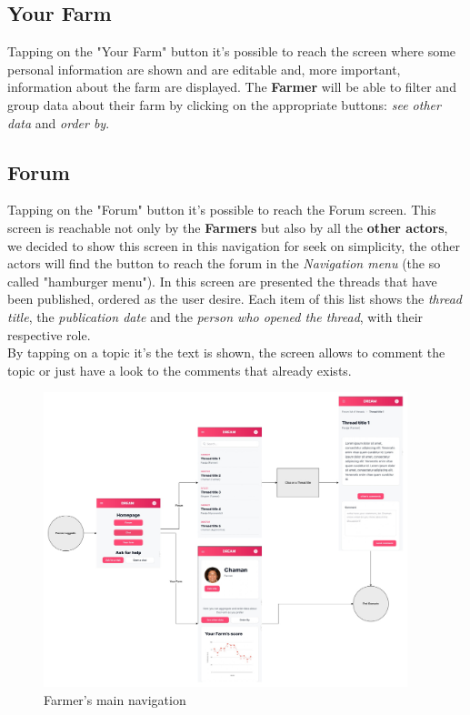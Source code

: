 \documentclass[10pt]{report}
\begin{document}
\subsection{Your Farm}
Tapping on the "Your Farm" button it's possible to reach the screen where some personal information are shown and are editable and, more important, information about the farm are displayed. The \textbf{Farmer} will be able to filter and group data about their farm by clicking on the appropriate buttons: \textit{see other data} and \textit{order by}.
\subsection{Forum}
Tapping on the "Forum" button it's possible to reach the Forum screen. This screen is reachable not only by the \textbf{Farmers} but also by all the \textbf{other actors}, we decided to show this screen in this navigation for seek on simplicity, the other actors will find the button to reach the forum in the \textit{Navigation menu} (the so called "hamburger menu"). 
In this screen are presented the threads that have been published, ordered as the user desire. Each item of this list shows the \textit{thread title}, the \textit{publication date} and the \textit{person who opened the thread}, with their respective role.\\
By tapping on a topic it's the text is shown, the screen allows to comment the topic or just have a look to the comments that already exists. 

\begin{figure}[H]
    \centering
    \includegraphics[width=400px]{Mockups/MockUpDiagram-Farmer.jpg}
    \caption{Farmer's main navigation}
\end{figure}
\end{document}
